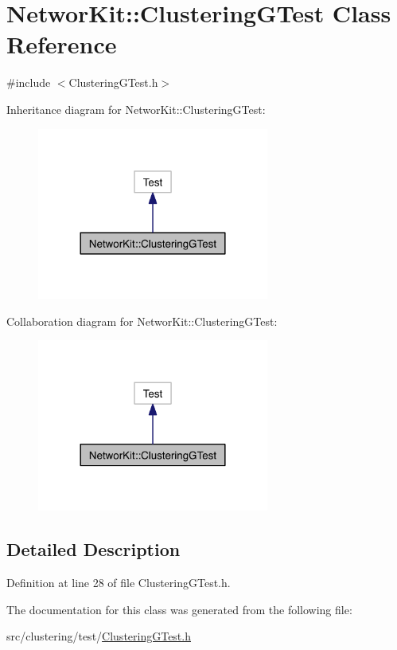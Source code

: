 \hypertarget{class_networ_kit_1_1_clustering_g_test}{\section{Networ\-Kit\-:\-:Clustering\-G\-Test Class Reference}
\label{class_networ_kit_1_1_clustering_g_test}
}


{\ttfamily \#include $<$Clustering\-G\-Test.\-h$>$}



Inheritance diagram for Networ\-Kit\-:\-:Clustering\-G\-Test\-:\nopagebreak
\begin{figure}[H]
\begin{center}
\leavevmode
\includegraphics[width=216pt]{class_networ_kit_1_1_clustering_g_test__inherit__graph}
\end{center}
\end{figure}


Collaboration diagram for Networ\-Kit\-:\-:Clustering\-G\-Test\-:\nopagebreak
\begin{figure}[H]
\begin{center}
\leavevmode
\includegraphics[width=216pt]{class_networ_kit_1_1_clustering_g_test__coll__graph}
\end{center}
\end{figure}


\subsection{Detailed Description}


Definition at line 28 of file Clustering\-G\-Test.\-h.



The documentation for this class was generated from the following file\-:\begin{DoxyCompactItemize}
\item 
src/clustering/test/\hyperlink{_clustering_g_test_8h}{Clustering\-G\-Test.\-h}\end{DoxyCompactItemize}
